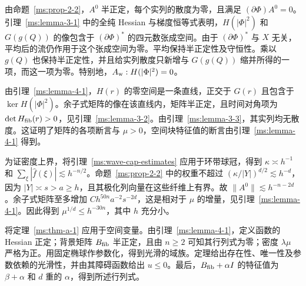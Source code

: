 由命题~\ref{ms:prop-2-2}，$A^0$ 半正定，每个实列的散度为零，且满足 $(\partial\Phi)A^0=0$。引理~\ref{ms:lemma-3-1} 中的全纯 Hessian 与梯度恒等式表明，$H(|\Phi|^2)$ 和 $G(g(Q))$ 的像包含于 $(\partial\Phi)^*$ 的四元数张成空间。由于 $(\partial\Phi)^*$ 与 $X$ 无关，平均后的流仍作用于这个张成空间为零。平均保持半正定性及守恒性。乘以 $g(Q)$ 也保持半正定性，并且给实列散度只新增与 $G(g(Q))$ 缩并所得的一项，而这一项为零。特别地，$A_{\rm w}:H(|\Phi|^2)=0$。

由引理~\ref{ms:lemma-4-1}，$H(r)$ 的零空间是一条直线，正交于 $G(r)$ 且包含于 $\ker H(|\Phi|^2)$。余子式矩阵的像在该直线内，矩阵半正定，且时间对角项为 $\det H_{\rm fib}(r)>0$，见引理~\ref{ms:lemma-3-2}。由引理~\ref{ms:lemma-3-3}，其实列均无散度。这证明了矩阵的各项断言与 $\mu>0$，空间块特征值的断言由引理~\ref{ms:lemma-4-1} 得到。

为证密度上界，将引理~\ref{ms:wave-cap-estimates} 应用于环带球冠，得到 $\kappa\asymp h^{-1}$ 和 $\sum_\xi |\widehat f(\xi)|\lesssim h^{-n/2}$。命题~\ref{ms:prop-2-2} 中的权重不超过 $(\kappa/|Y|)^{d/2}\lesssim h^{-d}$，因为 $|Y|\asymp s>a\ge h$，且其极化列向量在这些纤维上有界。故 $\|A^0\|\lesssim h^{-n-2d}$。余子式矩阵至多增加 $Ch^{50n}a^{-2}s^{-2d}$，这是相对于 $\mu$ 的增量，见引理~\ref{ms:lemma-4-1}。因此得到 $\mu^{1/d}\le h^{-30n}$，其中 $h$ 充分小。

将定理~\ref{ms:thm-a-1} 应用于空间变量。由引理~\ref{ms:lemma-4-1}，定义函数的 Hessian 正定；背景矩阵 $B_{\rm fib}$ 半正定，且由 $n\ge2$ 可知其行列式为零；密度 $\lambda\mu$ 严格为正。用固定椭球作参数化，得到光滑的域族。定理给出存在性、唯一性及参数依赖的光滑性，并由其障碍函数给出 $u\le0$。最后，$B_{\rm fib}+\alpha I$ 的特征值为 $\beta+\alpha$ 和 $d$ 重的 $\alpha$，得到所述行列式。
